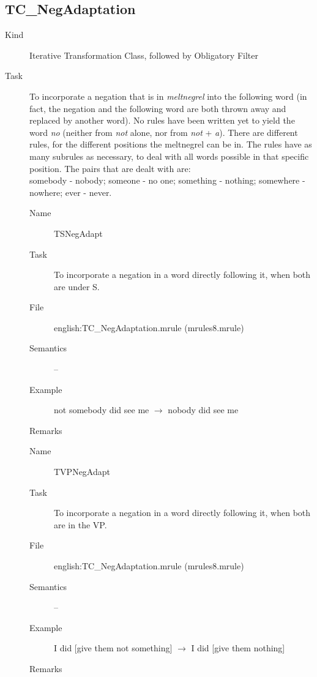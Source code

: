 \subsection{TC\_NegAdaptation}
\begin{description}
\item[Kind] Iterative Transformation Class, followed by Obligatory Filter
\item[Task] To incorporate a negation that is in {\em meltnegrel\/} into the 
following word (in fact, the 
negation and the following word are both thrown away and replaced by another 
word). No rules have been written yet to yield the word {\em no\/} (neither 
from {\em not\/} alone, nor from {\em not\/} + {\em a\/}). There are different 
rules, for the different positions the meltnegrel can be in. The rules have as 
many subrules as necessary, to deal with all words possible in that specific 
position. The pairs that are dealt with are:\\
somebody - nobody; someone - no one; something - nothing; somewhere - nowhere; 
ever - never.

\vspace{1 cm}
\begin{description}
\item[Name] TSNegAdapt
\item[Task] To incorporate a negation in a word directly following it, when 
both are under S.
\item[File] english:TC\_NegAdaptation.mrule (mrules8.mrule)
\item[Semantics] --
\item[Example] not somebody did see me $\rightarrow$ nobody did see me
\item[Remarks]
\end{description}

\vspace{1 cm}
\begin{description}
\item[Name] TVPNegAdapt
\item[Task] To incorporate a negation in a word directly following it, when 
both are in the VP.
\item[File] english:TC\_NegAdaptation.mrule (mrules8.mrule)
\item[Semantics] --
\item[Example] I did [give them not something] $\rightarrow$ I did [give them 
nothing]
\item[Remarks] 
\end{description}


\end{description}
